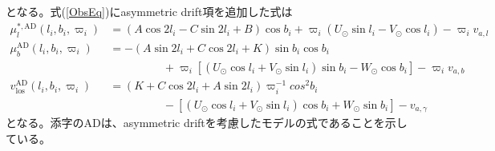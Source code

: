 となる。式(\ref{ObsEq})にasymmetric drift項を追加した式は
\begin{subequations}
\begin{align}
	\mu^{*,\mathrm{AD}}_l(l_i,b_i,\varpi_i) &= (A\cos2l_i - C\sin2l_i + B)\cos b_i + \varpi_i(U_{\odot}\sin l_i - V_{\odot}\cos l_i) - \varpi_i v_{a,l} \\
	\mu^{\mathrm{AD}}_b(l_i,b_i,\varpi_i) &= -(A\sin2l_i + C\cos2l_i + K)\sin b_i \cos b_i \nonumber \\
	                          & \hspace{2cm} + \varpi_i[(U_{\odot}\cos l_i + V_{\odot} \sin l_i)\sin b_i - W_{\odot} \cos b_i] - \varpi_i v_{a,b} \\
	v^{\mathrm{AD}}_{\mathrm{los}}(l_i,b_i,\varpi_i) &= (K + C\cos2l_i + A\sin2l_i)\varpi_i^{-1} cos^2 b_i \nonumber \\
	                      & \hspace{2cm} - [(U_{\odot}\cos l_i + V_{\odot} \sin l_i)\cos b_i + W_{\odot} \sin b_i] - v_{a,\gamma}
\end{align} \label{ObsEqAD}
\end{subequations}
となる。添字のADは、asymmetric driftを考慮したモデルの式であることを示している。







